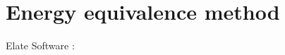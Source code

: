 \documentclass[10pt, onecolumn]{article}
\begin{document}
    

\section{Energy equivalence method}

Elate Software : \cite{Gaillac_2016}
\end{document}
